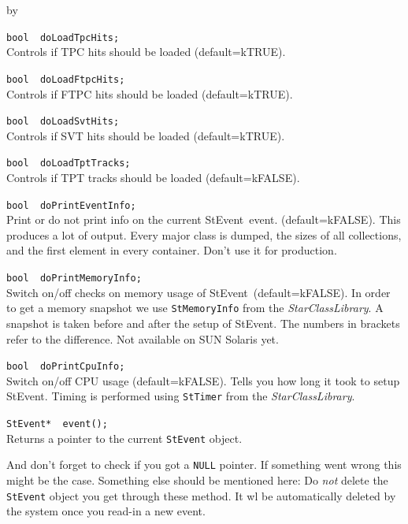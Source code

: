 \documentclass[twoside]{article}
\newcommand{\name}[1]{\textsl{#1}}%
\newcommand{\StEvent}{\textsf{StEvent}}
\newcommand{\entrylabel}[1]{\mbox{\textbf{{#1}}}\hfil}%
\newenvironment{entry}
{\begin{list}{}%
    {\renewcommand{\makelabel}{\entrylabel}%
     \setlength{\labelwidth}{90pt}%
     \setlength{\leftmargin}{\labelwidth}
     \advance\leftmargin by \labelsep%
      }%
    }%
  {\end{list}}
\newcommand{\Entrylabel}[1]%
{\raisebox{0pt}[1ex][0pt]{\makebox[\labelwidth][l]%
    {\parbox[t]{\labelwidth}{\hspace{0pt}\textbf{{#1}}}}}}
\newenvironment{Entry}%
{\renewcommand{\entrylabel}{\Entrylabel}\begin{entry}}%
  {\end{entry}}
\begin{document}
\begin{Entry}
    
\item[Public Data\\ Member]
    \verb+bool  doLoadTpcHits;+\\
    Controls if TPC hits should be loaded (default=kTRUE).
    
    \verb+bool  doLoadFtpcHits;+\\
    Controls if FTPC hits should be loaded (default=kTRUE).
    
    \verb+bool  doLoadSvtHits; +\\
    Controls if SVT hits should be loaded (default=kTRUE).
                              
    \verb+bool  doLoadTptTracks;+\\
    Controls if TPT tracks should be loaded (default=kFALSE).
    
    \verb+bool  doPrintEventInfo;+\\
    Print or do not print info on the current \StEvent\ event.
    (default=kFALSE).  This produces a lot of output. Every major
    class is dumped, the sizes of all collections, and the first
    element in every container. Don't use it for production.
    
    \verb+bool  doPrintMemoryInfo;+\\
    Switch on/off checks on memory usage of \StEvent\
    (default=kFALSE).  In order to get a memory snapshot we use
    \texttt{StMemoryInfo} from the \name{StarClassLibrary}.  A
    snapshot is taken before and after the setup of \StEvent.  The
    numbers in brackets refer to the difference. Not available on SUN
    Solaris yet.
    
    \verb+bool  doPrintCpuInfo;+\\
    Switch on/off CPU usage (default=kFALSE). Tells you how long it
    took to setup \StEvent. Timing is performed using \texttt{StTimer}
    from the \name{StarClassLibrary}.
    
\item[Public Member\\ Functions]
    \verb+StEvent*  event();+\\
    Returns a pointer to the current \texttt{StEvent} object.
\end{Entry}

And don't forget to check if you got a \texttt{NULL} pointer. If
something went wrong this might be the case. Something else should be
mentioned here: Do \emph{not} delete the \texttt{StEvent} object you
get through these method.  It wl be
automatically deleted by the system once you read-in a new event.
\vfill
\end{document}
